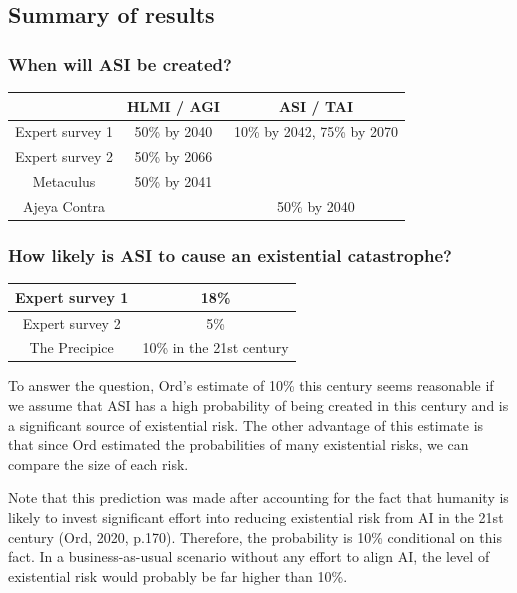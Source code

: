 \documentclass{article}
\begin{document}
\subsection{Summary of results}

\subsubsection{When will ASI be created?}

\vspace{2mm}

\begin{tabular}{|c|c|c|}
    \hline
    & HLMI / AGI & ASI / TAI  \\
    \hline
    Expert survey 1 & 50\% by 2040 & 10\% by 2042, 75\% by 2070 \\
    \hline
    Expert survey 2 & 50\% by 2066 & \\
    \hline
    Metaculus & 50\% by 2041 & \\
    \hline
    Ajeya Contra & & 50\% by 2040 \\
    \hline
\end{tabular}

\subsubsection{How likely is ASI to cause an existential catastrophe?}

\vspace{2mm}

\begin{tabular}{|c|c|}
    \hline
    Expert survey 1 & 18\% \\
    \hline
    Expert survey 2 & 5\% \\
    \hline
    The Precipice & 10\% in the 21st century \\
    \hline
\end{tabular}

\vspace{5mm}

To answer the question, Ord’s estimate of 10\% this century seems reasonable if we assume that ASI has a high probability of being created in this century and is a significant source of existential risk. The other advantage of this estimate is that since Ord estimated the probabilities of many existential risks, we can compare the size of each risk.

Note that this prediction was made after accounting for the fact that humanity is likely to invest significant effort into reducing existential risk from AI in the 21st century (Ord, 2020, p.170). Therefore, the probability is 10\% conditional on this fact. In a business-as-usual scenario without any effort to align AI, the level of existential risk would probably be far higher than 10\%.
\end{document}
